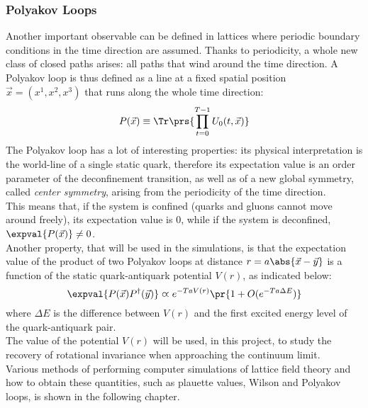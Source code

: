 \subsubsection{Polyakov Loops}
Another important observable can be defined in lattices where periodic boundary conditions in the time direction are assumed.
Thanks to periodicity, a whole new class of closed paths arises: all paths that wind around the time direction.
A Polyakov loop is thus defined as a line at a fixed spatial position $\vec{x}=(x^1,x^2,x^3)$ that runs along the whole time direction:
\begin{equation}
    P(\vec{x}) \equiv \Tr\prs{\prod_{t=0}^{T-1} U_0(t,\vec{x})} \label{1:PolyakovLoop}
\end{equation}
The Polyakov loop has a lot of interesting properties: its physical interpretation is the world-line of a single static quark, therefore its expectation value is an order parameter of the deconfinement transition, as well as of a new global symmetry, called \emph{center symmetry}, arising from the periodicity of the time direction.\\
This means that, if the system is confined (quarks and gluons cannot move around freely), its expectation value is $0$, while if the system is deconfined, $\expval{P(\vec{x})}\neq0$.\\
Another property, that will be used in the simulations, is that the expectation value of the product of two Polyakov loops at distance $r=a\abs{\vec{x}-\vec{y}}$ is a function of the static quark-antiquark potential $V(r)$, as indicated below:
\begin{equation}
    \expval{P(\vec{x})P^\dagger(\vec{y})} \varpropto e^{-TaV(r)}\pr{1+O(e^{-Ta\Delta E})} \label{1:PolyakovPotential}
\end{equation}
where $\Delta E$ is the difference between $V(r)$ and the first excited energy level of the quark-antiquark pair.\\
The value of the potential $V(r)$ will be used, in this project, to study the recovery of rotational invariance when approaching the continuum limit.\\
Various methods of performing computer simulations of lattice field theory and how to obtain these quantities, such as plauette values, Wilson and Polyakov loops, is shown in the following chapter.
